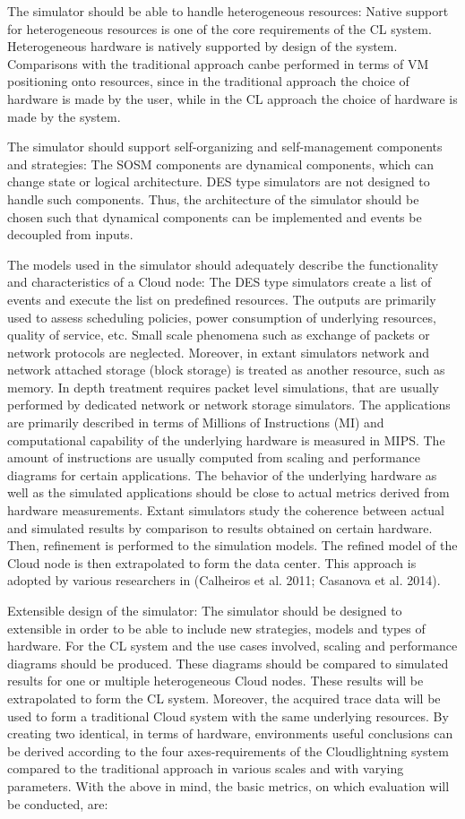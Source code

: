 The simulator should be able to handle heterogeneous resources: Native support for heterogeneous resources is one of the core requirements of the CL system. Heterogeneous hardware is natively supported by design of the system. Comparisons with the traditional approach canbe performed in terms of VM positioning onto resources, since in the traditional approach the choice of hardware is made by the user, while in the CL approach the choice of hardware is made by the system.

The simulator should support self-organizing and self-management components and strategies: The SOSM components are dynamical components, which can change state or logical architecture. DES type simulators are not designed to handle such components. Thus, the architecture of the simulator should be chosen such that dynamical components can be implemented and events be decoupled from inputs.

The models used in the simulator should adequately describe the functionality and characteristics of a Cloud node: The DES type simulators create a list of events and execute the list on predefined resources. The outputs are primarily used to assess scheduling policies, power consumption of underlying resources, quality of service, etc. Small scale phenomena such as exchange of packets or network protocols are neglected. Moreover, in extant simulators network and network attached storage (block storage) is treated as another resource, such as memory. In depth treatment requires packet level simulations, that are usually performed by dedicated network or network storage simulators. The applications are primarily described in terms of Millions of Instructions (MI) and computational capability of the underlying hardware is measured in MIPS. The amount of instructions are usually computed from scaling and performance diagrams for certain applications. The behavior of the underlying hardware as well as the simulated applications should be close to actual metrics derived from hardware measurements. Extant simulators study the coherence between actual and simulated results by comparison to results obtained on certain hardware. Then, refinement is performed to the simulation models. The refined model of the Cloud node is then extrapolated to form the data center. This approach is adopted by various researchers in (Calheiros et al. 2011; Casanova et al. 2014).

Extensible design of the simulator: The simulator should be designed to extensible in order to be able to include new strategies, models and types of hardware. For the CL system and the use cases involved, scaling and performance diagrams should be produced. These diagrams should be compared to simulated results for one or multiple heterogeneous Cloud nodes.  These results will be extrapolated to form the CL system. Moreover, the acquired trace data will be used to form a traditional Cloud system with the same underlying resources. By creating two identical, in terms of hardware, environments useful conclusions can be derived according to the four axes-requirements of the Cloudlightning system compared to the traditional approach in various scales and with varying parameters. With the above in mind, the basic metrics, on which evaluation will be conducted, are:

